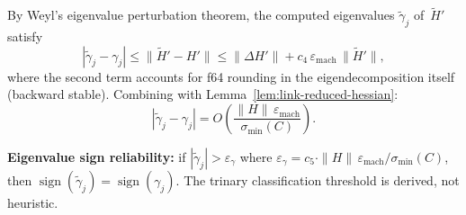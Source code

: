 \begin{lemma}%
\label{lem:link-eigenvalues}
By Weyl's eigenvalue perturbation theorem,
the computed eigenvalues $\tilde\gamma_j$ of~$\tilde H'$
satisfy
\[
  |\tilde\gamma_j - \gamma_j|
  \leq \|\tilde H' - H'\|
  \leq \|\Delta H'\| + c_4\, \varepsilon_{\mathrm{mach}}\, \|\tilde H'\|,
\]
where the second term accounts for f64 rounding in the
eigendecomposition itself (backward stable).
Combining with Lemma~\ref{lem:link-reduced-hessian}:
\begin{equation}\label{eq:eigenvalue-perturbation}
  |\tilde\gamma_j - \gamma_j|
  = O\!\left(
    \frac{\|H\|\, \varepsilon_{\mathrm{mach}}}{\sigma_{\min}(C)}
  \right).
\end{equation}

\textbf{Eigenvalue sign reliability:}
if $|\tilde\gamma_j| > \varepsilon_\gamma$
where
$\varepsilon_\gamma = c_5 \cdot \|H\|\, \varepsilon_{\mathrm{mach}} / \sigma_{\min}(C)$,
then $\operatorname{sign}(\tilde\gamma_j) = \operatorname{sign}(\gamma_j)$.
The trinary classification threshold is derived, not heuristic.
\end{lemma}


